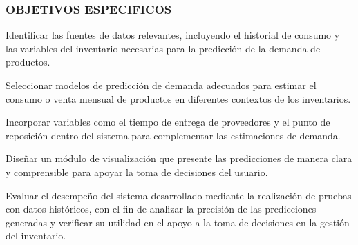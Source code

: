 \subsubsection{OBJETIVOS ESPECIFICOS}

Identificar las fuentes de datos relevantes, incluyendo el historial de consumo y las variables del inventario necesarias para la predicción de la demanda de productos.

Seleccionar modelos de predicción de demanda adecuados para estimar el consumo o venta mensual de productos en diferentes contextos de los inventarios.

Incorporar variables como el tiempo de entrega de proveedores y el punto de reposición dentro del sistema para complementar las estimaciones de demanda.

Diseñar un módulo de visualización que presente las predicciones de manera clara y comprensible para apoyar la toma de decisiones del usuario.

Evaluar el desempeño del sistema desarrollado mediante la realización de pruebas con datos históricos, con el fin de analizar la precisión de las predicciones generadas y verificar su utilidad en el apoyo a la toma de decisiones en la gestión del inventario.